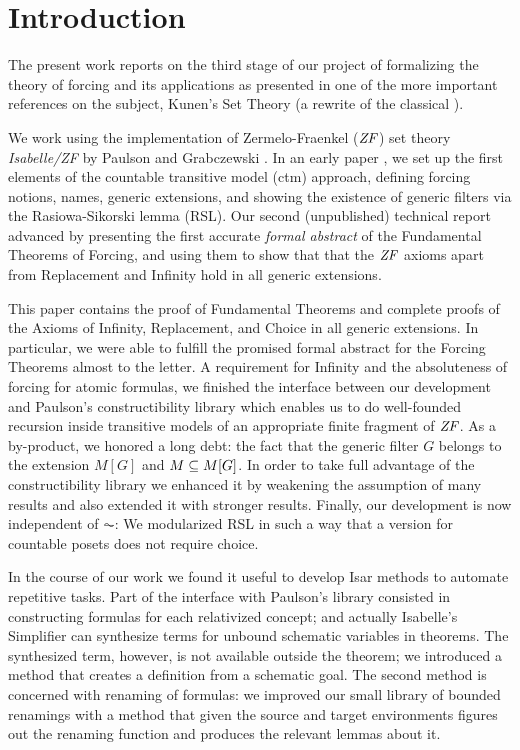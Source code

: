 \section{Introduction}
\label{sec:introduction}

The present work reports on the third stage of our project of
formalizing the theory of forcing and its applications as presented in
one of the more
important references on the subject, Kunen's Set Theory
\cite{kunen2011set} (a rewrite of the classical \cite{kunen1980}). 

We
work using the  implementation of Zermelo-Fraenkel ($\mathit{ZF}$)
set theory \emph{Isabelle/ZF} by Paulson and Grabczewski \cite{DBLP:journals/jar/PaulsonG96}. In
an early paper \cite{2018arXiv180705174G}, we set up the first
elements of the countable transitive model (ctm) approach, defining
forcing notions, names, generic extensions, and
showing the existence of generic filters via the Rasiowa-Sikorski
lemma (RSL). Our second (unpublished) technical report
\cite{2019arXiv190103313G} advanced by presenting the first accurate
\emph{formal abstract} of the Fundamental Theorems of Forcing, and
using them to show that that the $\mathit{ZF}$ axioms apart from Replacement
and Infinity hold in all generic extensions.

This paper contains the proof of Fundamental Theorems and complete
proofs of the Axioms of Infinity, Replacement, and Choice in all
generic extensions. In particular, we were able to fulfill the
promised formal abstract for the Forcing 
Theorems almost to the letter. A requirement for Infinity and the
absoluteness of forcing for atomic formulas, we finished the interface
between our development and
Paulson's constructibility library \cite{paulson_2003} which enables
us to do well-founded
recursion inside transitive models of an appropriate finite fragment
of $\mathit{ZF}$. As a by-product, we honored a long debt: the fact that the
generic filter $G$ belongs to the extension $M[G]$ and 
$M\subseteq M[G]$. 
In order to take full advantage of the constructibility library
we enhanced it by weakening the assumption of many results and also
extended it with stronger results. %
Finally, our development is now independent of $\AC$: We modularized
RSL in such a way that a version for countable 
posets does not require choice.

In the course of our work we found it useful to develop Isar methods to
automate repetitive tasks. Part of the interface with Paulson's
library consisted in constructing formulas for each relativized
concept; and actually Isabelle's Simplifier can
synthesize terms for unbound schematic variables in theorems. The
synthesized term, however, is not available outside the theorem; we
introduced a method that creates a definition from a schematic
goal. The second method is concerned with renaming of formulas: we
improved our small library of bounded renamings with a method that
given the source and target environments figures out the renaming
function and produces the relevant lemmas about it.

